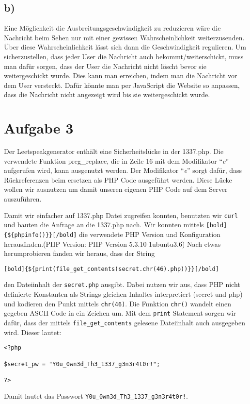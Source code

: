 \documentclass[10pt,a4paper]{article}
\begin{document}
\subsection*{b)}
Eine Möglichkeit die Ausbreitungsgeschwindigkeit zu reduzieren wäre die Nachricht beim Sehen nur mit einer gewissen Wahrscheinlichkeit weiterzusenden. Über diese Wahrscheinlichkeit lässt sich dann die Geschwindigkeit regulieren. Um sicherzustellen, dass jeder User die Nachricht auch bekommt/weiterschickt, muss man dafür sorgen, dass der User die Nachricht nicht löscht bevor sie weitergeschickt wurde. Dies kann man erreichen, indem man die Nachricht vor dem User versteckt. Dafür könnte man per JavaScript die Website so anpassen, dass die Nachricht nicht angezeigt wird bis sie weitergeschickt wurde.

\section*{Aufgabe 3}

Der Leetspeakgenerator enthält eine Sicherheitslücke in der 1337.php. Die verwendete Funktion preg\_replace, die in Zeile 16 mit dem Modifikator "`\textit{e}"' aufgerufen wird, kann ausgenutzt werden. Der Modifikator "`\textit{e}"' sorgt dafür, dass Rückreferenzen beim ersetzen als PHP Code ausgeführt werden. Diese Lücke wollen wir ausnutzen um damit unseren eigenen PHP Code auf dem Server auszuführen.

 Damit wir einfacher auf 1337.php Datei zugreifen konnten, benutzten wir \texttt{curl} und bauten die Anfrage an die 1337.php nach. Wir konnten mittels \texttt{[bold]\{\$\{phpinfo()\}\}[/bold]} die verwendete PHP Version und Konfiguration herausfinden.(PHP Version: PHP Version 5.3.10-1ubuntu3.6) Nach etwas herumprobieren fanden wir heraus, dass der String 
\begin{verbatim}
[bold]{${print(file_get_contents(secret.chr(46).php))}}[/bold] 
\end{verbatim}
den Dateiinhalt der \texttt{secret.php} ausgibt. Dabei nutzen wir aus, dass PHP nicht definierte Konstanten als Strings gleichen Inhaltes interpretiert (secret und php) und kodieren den Punkt mittels \texttt{chr(46)}. Die Funktion \texttt{chr()} wandelt einen gegeben ASCII Code in ein Zeichen um. Mit dem \texttt{print} Statement sorgen wir dafür, dass der mittels \texttt{file\_get\_contents} gelesene Dateiinhalt auch ausgegeben wird.
Dieser lautet:
\begin{verbatim}
<?php

$secret_pw = "Y0u_0wn3d_Th3_1337_g3n3r4t0r!";

?>
\end{verbatim}
Damit lautet das Passwort \texttt{Y0u\_0wn3d\_Th3\_1337\_g3n3r4t0r!}. 
\end{document}
